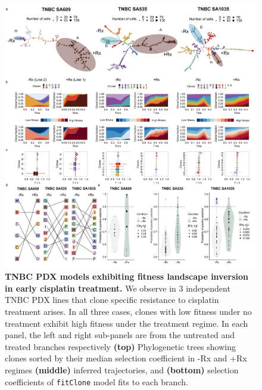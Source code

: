 \begin{figure}
\centering
\includegraphics[width=\textwidth]{Figures/chap4/landscapefitness.png}
	
\caption[Fitness landscape reversal in early cisplatin treatment in TNBC PDX models.]
	{\small
	\textbf{TNBC PDX models exhibiting fitness landscape inversion in early cisplatin treatment.}
	     We observe in 3 independent TNBC PDX lines that clone specific resistance to cisplatin treatment arises. In all three cases, clones with low fitness under no treatment exhibit high fitness under the treatment regime. In each panel, the left and right sub-panels are from the untreated and treated branches respectively \textbf{(top)} Phylogenetic trees showing clones sorted by their median selection coefficient in -Rx and +Rx regimes  \textbf{(middle)} inferred trajectories, and \textbf{(bottom)} selection coefficients of \texttt{fitClone} model fits to each branch.
	}
	\label{fig:landscapefitness}
\end{figure}

